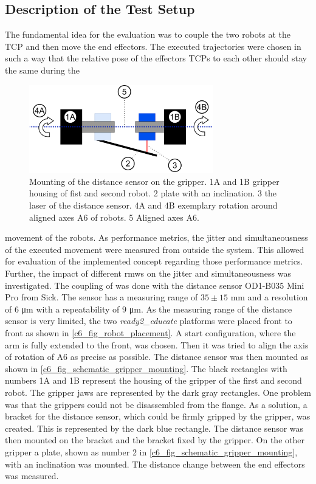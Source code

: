 \subsection{Description of the Test Setup}\label{c6_sec_description}
The fundamental idea for the evaluation was to couple the two robots at the TCP and then move the end effectors. The executed trajectories were chosen in such a way that the relative pose of the effectors TCPs to each other should stay the same during the
\begin{figure}
\includegraphics[width=8cm]{Figures/c6/schematic_messurement_rotation.pdf}
\caption{Mounting of the distance sensor on the gripper. 1A and 1B gripper housing of fist and second robot. 2 plate with an inclination. 3 the laser of the distance sensor. 4A and 4B exemplary rotation around aligned axes A6 of robots. 5 Aligned axes A6.} \label{c6_fig_schematic_gripper_mounting}
\end{figure}
 movement of the robots. \newline
 As performance metrics, the jitter and simultaneousness of the executed movement were measured from outside the system. This allowed for evaluation of the implemented concept regarding those performance metrics. Further, the impact of different \glspl{rmw} on the jitter and simultaneousness was investigated. \newline
 The coupling of was done with the distance sensor OD1-B035 Mini Pro from Sick. The sensor has a measuring range of $35\pm15$ \si{\milli\meter} and a resolution of $6$ \si{\micro\meter} with a repeatability of $9$ \si{\micro\meter}. As the measuring range of the distance sensor is very limited, the two \textit{ready2\_educate} platforms were placed front to front as shown in \autoref{c6_fig_robot_placement}. A start configuration, where the arm is fully extended to the front, was chosen. Then it was tried to align the axis of rotation of A6 as precise as possible. The distance sensor was then mounted as shown in \autoref{c6_fig_schematic_gripper_mounting}. The black rectangles with numbers 1A and 1B represent the housing of the gripper of the first and second robot. The gripper jaws are represented by the dark gray rectangles. One problem was that the grippers could not be disassembled from the flange. As a solution, a bracket for the distance sensor, which could be firmly gripped by the gripper, was created. This is represented by the dark blue rectangle. The distance sensor was then mounted on the bracket and the bracket fixed by the gripper. On the other gripper a plate, shown as number 2 in \autoref{c6_fig_schematic_gripper_mounting},  with an inclination was mounted. The distance change between the end effectors was measured.
